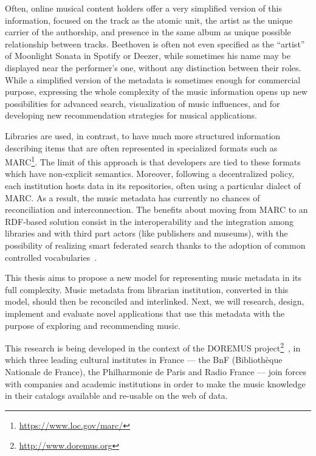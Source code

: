 \documentclass{llncs}
\begin{document}
Often, online musical content holders offer a very simplified version of this information, focused on the track as the atomic unit, the artist as the unique carrier of the authorship, and presence in the same album as unique possible relationship between tracks. Beethoven is often not even specified as the ``artist'' of Moonlight Sonata in Spotify or Deezer, while sometimes his name may be displayed near the performer's one, without any distinction between their roles. While a simplified version of the metadata is sometimes enough for commercial purpose, expressing the whole complexity of the music information opens up new possibilities for advanced search, visualization of music influences, and for developing new recommendation strategies for musical applications.

Libraries are used, in contrast, to have much more structured information describing items that are often represented in specialized formats such as MARC\footnote{\url{https://www.loc.gov/marc/}}. The limit of this approach is that developers are tied to these formats which have non-explicit semantics. Moreover, following a decentralized policy, each institution hosts data in its repositories, often using a particular dialect of MARC. As a result, the music metadata has currently no chances of reconciliation and interconnection. The benefits about moving from MARC to an RDF-based solution consist in the interoperability and the integration among libraries and with third part actors (like publishers and museums), with the possibility of realizing smart federated search thanks to the adoption of common controlled vocabularies~\cite{byrne2010strongest}.

This thesis aims to propose a new model for representing music metadata in its full complexity. Music metadata from librarian institution, converted in this model, should then be reconciled and interlinked. Next, we will research, design, implement and evaluate novel applications that use this metadata with the purpose of exploring and recommending music.

This research is being developed in the context of the DOREMUS project\footnote{\url{http://www.doremus.org}}~\cite{achichidoremus}, in which three leading cultural institutes in France --- the BnF (Biblioth\`eque Nationale de France), the Philharmonie de Paris and Radio France --- join forces with companies and academic institutions in order to make the music knowledge in their catalogs available and re-usable on the web of data.

\end{document}
